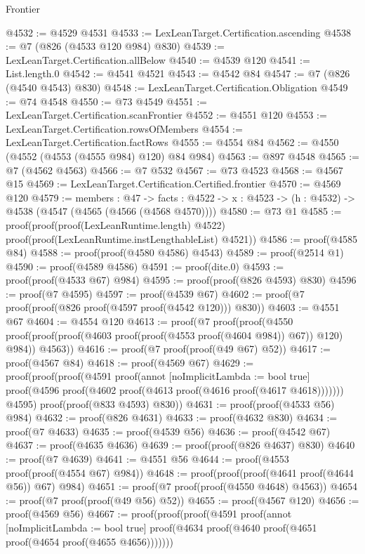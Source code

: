 \begin{lexlean}{Frontier}
\begin{coremodule}
@4532 := @4529 @4531
@4533 := LexLeanTarget.Certification.ascending
@4538 := @7 (@826 (@4533 @120 @984) @830)
@4539 := LexLeanTarget.Certification.allBelow
@4540 := @4539 @120
@4541 := List.length.{0}
@4542 := @4541 @4521
@4543 := @4542 @84
@4547 := @7 (@826 (@4540 @4543) @830)
@4548 := LexLeanTarget.Certification.Obligation
@4549 := @74 @4548
@4550 := @73 @4549
@4551 := LexLeanTarget.Certification.scanFrontier
@4552 := @4551 @120
@4553 := LexLeanTarget.Certification.rowsOfMembers
@4554 := LexLeanTarget.Certification.factRows
@4555 := @4554 @84
@4562 := @4550 (@4552 (@4553 (@4555 @984) @120) @84 @984)
@4563 := @897 @4548
@4565 := @7 (@4562 @4563)
@4566 := @7 @532
@4567 := @73 @4523
@4568 := @4567 @15
@4569 := LexLeanTarget.Certification.Certified.frontier
@4570 := @4569 @120
@4579 := {members : @47} ->
  {facts : @4522} -> {x : @4523} -> (h : @4532) -> @4538 (@4547 (@4565 (@4566 (@4568 @4570))))
@4580 := @73 @1
@4585 := proof(proof(proof(LexLeanRuntime.length) @4522)
      proof(proof(LexLeanRuntime.instLengthableList) @4521))
@4586 := proof(@4585 @84)
@4588 := proof(proof(@4580 @4586) @4543)
@4589 := proof(@2514 @1)
@4590 := proof(@4589 @4586)
@4591 := proof(dite.{0})
@4593 := proof(proof(@4533 @67) @984)
@4595 := proof(proof(@826 @4593) @830)
@4596 := proof(@7 @4595)
@4597 := proof(@4539 @67)
@4602 := proof(@7 proof(proof(@826 proof(@4597 proof(@4542 @120))) @830))
@4603 := @4551 @67
@4604 := @4554 @120
@4613 := proof(@7
      proof(proof(@4550
            proof(proof(proof(@4603 proof(proof(@4553 proof(@4604 @984)) @67)) @120) @984))
          @4563))
@4616 := proof(@7 proof(proof(@49 @67) @52))
@4617 := proof(@4567 @84)
@4618 := proof(@4569 @67)
@4629 := proof(proof(proof(@4591
          proof(annot [noImplicitLambda := bool true]
            proof(@4596 proof(@4602 proof(@4613 proof(@4616 proof(@4617 @4618)))))))
        @4595)
      proof(proof(@833 @4593) @830))
@4631 := proof(proof(@4533 @56) @984)
@4632 := proof(@826 @4631)
@4633 := proof(@4632 @830)
@4634 := proof(@7 @4633)
@4635 := proof(@4539 @56)
@4636 := proof(@4542 @67)
@4637 := proof(@4635 @4636)
@4639 := proof(proof(@826 @4637) @830)
@4640 := proof(@7 @4639)
@4641 := @4551 @56
@4644 := proof(@4553 proof(proof(@4554 @67) @984))
@4648 := proof(proof(proof(@4641 proof(@4644 @56)) @67) @984)
@4651 := proof(@7 proof(proof(@4550 @4648) @4563))
@4654 := proof(@7 proof(proof(@49 @56) @52))
@4655 := proof(@4567 @120)
@4656 := proof(@4569 @56)
@4667 := proof(proof(proof(@4591
          proof(annot [noImplicitLambda := bool true]
            proof(@4634 proof(@4640 proof(@4651 proof(@4654 proof(@4655 @4656)))))))

\end{coremodule}
\end{lexlean}
